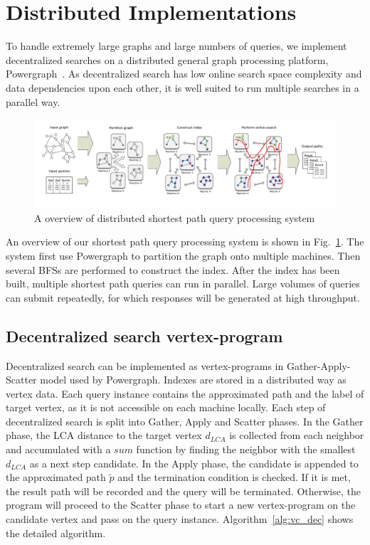 \section{Distributed Implementations}
\label{implementation}

To handle extremely large graphs and large numbers of queries, we implement decentralized searches on a distributed general graph processing platform, Powergraph~\cite{180251}. As decentralized search has low online search space complexity and data dependencies upon each other, it is well suited to run multiple searches in a parallel way. 

\begin{figure}[ht]
		\vspace{-0.7cm}
    \centering
    \includegraphics[width=\linewidth]{./figures/new_illustrate/system.pdf}
		\vspace{-1.2cm}
    \caption{A overview of distributed shortest path query processing system}
    \label{fig:system}
		\vspace{-2mm}
\end{figure}

An overview of our shortest path query processing system is shown in Fig.~\ref{fig:system}. The system first use Powergraph to partition the graph onto multiple machines. Then several BFSs are performed to construct the index. After the index has been built, multiple shortest path queries can run in parallel. Large volumes of queries can submit repeatedly, for which responses will be generated at high throughput.

\subsection{Decentralized search vertex-program}

Decentralized search can be implemented as vertex-programs in Gather-Apply-Scatter model used by Powergraph. Indexes are stored in a distributed way as vertex data. Each query instance contains the approximated path and the label of target vertex, as it is not accessible on each machine locally. Each step of decentralized search is split into Gather, Apply and Scatter phases. In the Gather phase, the LCA distance to the target vertex $d_{LCA}$ is collected from each neighbor and accumulated with a $sum$ function by finding the neighbor with the smallest $d_{LCA}$ as a next step candidate. In the Apply phase, the candidate is appended to the approximated path $\tilde{p}$ and the termination condition is checked. If it is met, the result path will be recorded and the query will be terminated. Otherwise, the program will proceed to the Scatter phase to start a new vertex-program on the candidate vertex and pass on the query instance. Algorithm~\ref{alg:vc_dec} shows the detailed algorithm.

